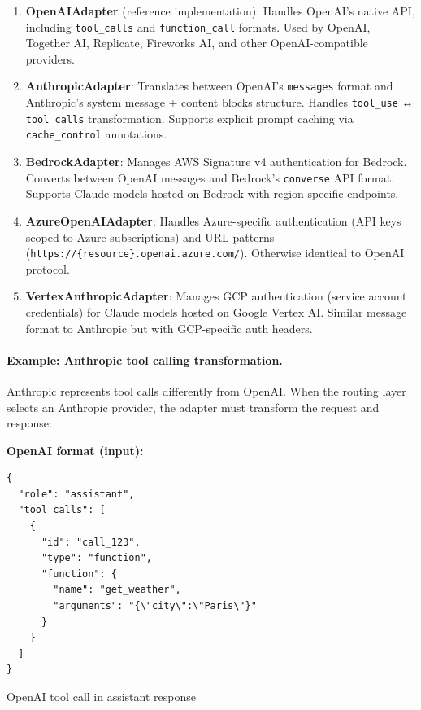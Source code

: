 \documentclass[english]{article}
\begin{document}
\begin{enumerate}
    \item \textbf{OpenAIAdapter} (reference implementation): Handles OpenAI's native API, including \texttt{tool\_calls} and \texttt{function\_call} formats. Used by OpenAI, Together AI, Replicate, Fireworks AI, and other OpenAI-compatible providers.

    \item \textbf{AnthropicAdapter}: Translates between OpenAI's \texttt{messages} format and Anthropic's system message + content blocks structure. Handles \texttt{tool\_use} ↔ \texttt{tool\_calls} transformation. Supports explicit prompt caching via \texttt{cache\_control} annotations.

    \item \textbf{BedrockAdapter}: Manages AWS Signature v4 authentication for Bedrock. Converts between OpenAI messages and Bedrock's \texttt{converse} API format. Supports Claude models hosted on Bedrock with region-specific endpoints.

    \item \textbf{AzureOpenAIAdapter}: Handles Azure-specific authentication (API keys scoped to Azure subscriptions) and URL patterns (\texttt{https://\{resource\}.openai.azure.com/}). Otherwise identical to OpenAI protocol.

    \item \textbf{VertexAnthropicAdapter}: Manages GCP authentication (service account credentials) for Claude models hosted on Google Vertex AI. Similar message format to Anthropic but with GCP-specific auth headers.
\end{enumerate}

\paragraph{Example: Anthropic tool calling transformation.}

Anthropic represents tool calls differently from OpenAI. When the routing layer selects an Anthropic provider, the adapter must transform the request and response:

\textbf{OpenAI format (input):}
\begin{listing}[H]
\begin{verbatim}
{
  "role": "assistant",
  "tool_calls": [
    {
      "id": "call_123",
      "type": "function",
      "function": {
        "name": "get_weather",
        "arguments": "{\"city\":\"Paris\"}"
      }
    }
  ]
}
\end{verbatim}
\caption{OpenAI tool call in assistant response}
\end{listing}
\end{document}
